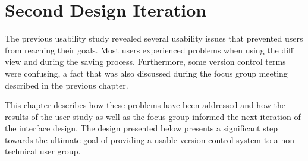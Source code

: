 \chapter{Second Design Iteration} \label{chapter:design-second-iteration}
The previous usability study revealed several usability issues that prevented users from reaching their goals. Most users experienced problems when using the diff view and during the saving process. Furthermore, some version control terms were confusing, a fact that was also discussed during the focus group meeting described in the previous chapter.

This chapter describes how these problems have been addressed and how the results of the user study as well as the focus group informed the next iteration of the interface design. The design presented below presents a significant step towards the ultimate goal of providing a usable version control system to a non-technical user group.






